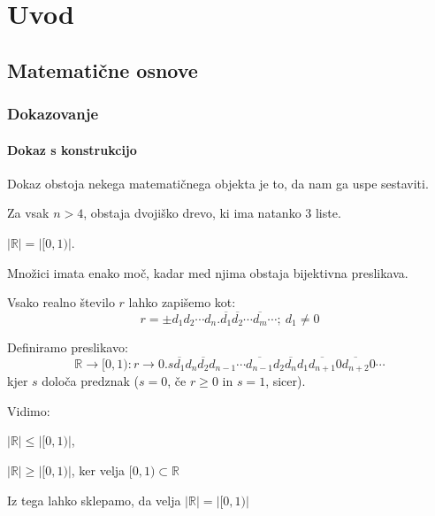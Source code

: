 \documentclass[10pt,a4paper,oneside]{book}
\begin{document}

\pagebreak
\chapter{Uvod}
\section{Matematične osnove}
\subsection{Dokazovanje}
\subsubsection{Dokaz s konstrukcijo}
Dokaz obstoja nekega matematičnega objekta je to, da nam ga uspe sestaviti.

\begin{primeri}
\item Za vsak $n>4$, obstaja dvojiško drevo, ki ima natanko $3$ liste.
\item $| \mathbb{R} | = | [0,1) |$.\\
	\begin{items}
	\item Množici imata enako moč, kadar med njima obstaja bijektivna preslikava.
	\item Vsako realno število $r$ lahko zapišemo kot:
	\[ r=\pm d_1 d_2 \cdots d_n . \overline{d_1}\overline{d_2} \cdots \overline{d_m} \cdots;\ d_1 \neq 0 \]
	\item Definiramo preslikavo:
	\[ \mathbb{R}\rightarrow [0,1): r \rightarrow 0.s\overline{d_1} d_{n} \overline{d_2} d_{n-1} \cdots \overline{d_{n-1}} d_2 \overline{d_n} d_1 \overline{d_{n+1}} 0\overline{d_{n+2}} 0 \cdots \]
	kjer $s$ določa predznak ($s=0$, če $r \ge 0$ in $s=1$, sicer).
	\item Vidimo:
		\begin{items}
		\item $|\mathbb{R}|\le |[0,1)|$, %
		\item $|\mathbb{R}|\ge |[0,1)|$, ker velja $[0,1) \subset \mathbb{R}$
		\end{items}
	\item Iz tega lahko sklepamo, da velja $|\mathbb{R}|=|[0,1)|$
	\end{items}
\end{primeri}
	
\end{document}
